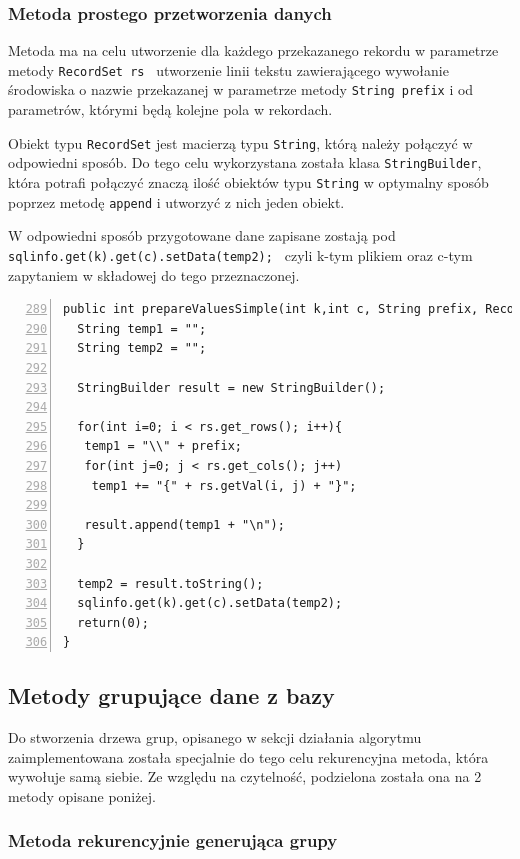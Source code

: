 \subsubsection*{Metoda prostego przetworzenia danych}

Metoda ma na celu utworzenie dla każdego przekazanego rekordu w parametrze metody \texttt{RecordSet rs } utworzenie linii tekstu zawierającego wywołanie środowiska o nazwie przekazanej w parametrze metody \texttt{String prefix} i od parametrów, którymi będą kolejne pola w rekordach. 
\par 
Obiekt typu \texttt{RecordSet} jest macierzą typu \texttt{String}, którą należy połączyć w odpowiedni sposób. Do tego celu wykorzystana została klasa \texttt{StringBuilder}, która potrafi połączyć znaczą ilość obiektów typu \texttt{String} w optymalny sposób poprzez metodę \texttt{append} i utworzyć z nich jeden obiekt.
\par
W odpowiedni sposób przygotowane dane zapisane zostają pod  \texttt{sqlinfo.get(k).get(c).setData(temp2); } czyli k-tym plikiem oraz c-tym zapytaniem w składowej do tego przeznaczonej.

 \begin{lstlisting}[numbers=left,firstnumber=289]
 public int prepareValuesSimple(int k,int c, String prefix, RecordSet rs){
  String temp1 = "";
  String temp2 = "";

  StringBuilder result = new StringBuilder(); 
       
  for(int i=0; i < rs.get_rows(); i++){
   temp1 = "\\" + prefix;
   for(int j=0; j < rs.get_cols(); j++)
    temp1 += "{" + rs.getVal(i, j) + "}";
        
   result.append(temp1 + "\n");
  }

  temp2 = result.toString();
  sqlinfo.get(k).get(c).setData(temp2); 
  return(0);
}
  \end{lstlisting}

\subsection{Metody grupujące dane z bazy}

Do stworzenia drzewa grup, opisanego w sekcji działania algorytmu zaimplementowana została specjalnie do tego celu rekurencyjna metoda, która wywołuje samą siebie. Ze względu na czytelność, podzielona została ona na 2 metody opisane poniżej.

\subsubsection*{Metoda rekurencyjnie generująca grupy}

